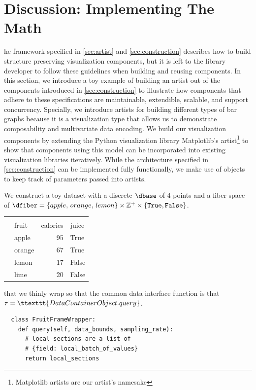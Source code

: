 \documentclass[10pt,journal,compsoc]{IEEEtran}
\theoremstyle{definition}
\theoremstyle{remark}
\begin{document}
\section{Discussion: Implementing The Math}
he framework specified in \autoref{sec:artist} and \autoref{sec:construction} describes how to build structure preserving visualization components, but it is left to the library developer to follow these guidelines when building and reusing components. 
In this section, we introduce a toy example of building an artist out of the components introduced in \autoref{sec:construction} to illustrate how components that adhere to these specifications are maintainable, extendible, scalable, and support concurrency. Specially, we introduce artists for building different types of bar graphs because it is a visualization type that allows us to demonstrate  composability and multivariate data encoding. We build our visualization components by extending the Python visualization library Matplotlib's artist\footnote{Matplotlib artists are our artist's namesake}\cite{hunterMatplotlib2DGraphics2007,hunterArchitectureOpenSource} to show that components using this model can be incorporated into existing visualization libraries iteratively. While the architecture specified in \autoref{sec:construction} can be implemented fully functionally, we make use of objects to keep track of parameters passed into artists. 

We construct a toy dataset with a discrete $\dbase$ of 4 points and a fiber space of $\dfiber=\{apple,\, orange,\, lemon\}\times \mathbb{Z}^{+} \times \{\texttt{True}, \texttt{False}\}$. 
\begin{table}[h!]
\begin{tabular}{|llrl|}
  \hline \\
  &   fruit &  calories &  juice \\
  \hline
  &   apple &        95 &   True \\ &  orange &        67 &   True \\ &   lemon &        17 &  False \\ &    lime &        20 &  False \\
  \hline
\end{tabular}
\end{table}
that we thinly wrap so that the common data interface function is that $\tau = \ttexttt{DataContainerObject.query}$. 
\begin{verbatim}
  class FruitFrameWrapper:
    def query(self, data_bounds, sampling_rate):
      # local sections are a list of
      # {field: local_batch_of_values}
      return local_sections
\end{verbatim}
\end{document}
